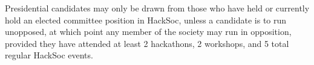\begin{clause}
  Presidential candidates may only be drawn from those who have held or currently hold an elected committee position in HackSoc, unless a candidate is to run unopposed, at which point any member of the society may run in opposition, provided they have attended at least 2 hackathons, 2 workshops, and 5 total regular HackSoc events.
\end{clause}
